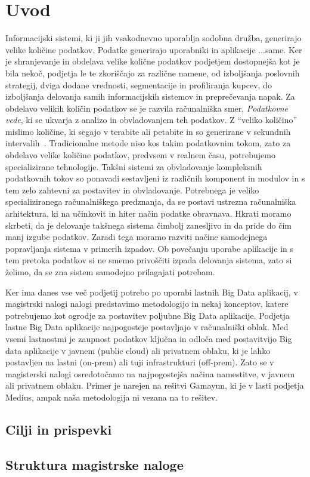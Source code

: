 \section{Uvod}

Informacijski sistemi, ki ji jih vsakodnevno uporablja sodobna družba, 
generirajo velike količine podatkov. 
Podatke generirajo uporabniki in aplikacije ...same. Ker je shranjevanje in 
obdelava velike količne podatkov podjetjem dostopnejša kot je bila nekoč, 
podjetja le te zkoriščajo za različne namene, od izboljšanja poslovnih strategij, 
dviga dodane vrednosti, segmentacije in profiliranja kupcev, 
do izboljšanja delovanja samih informacijskih sistemov in preprečevanja napak.
Za obdelavo velikih količin podatkov se je razvila računalniška smer, 
\textit{Podatkovne vede}, ki se ukvarja z analizo
in obvladovanjem teh podatkov.
Z \enquote{veliko količino} mislimo količine, ki segajo v terabite ali petabite 
in so generirane v sekundnih intervalih~\cite{toward_scalable_systems_big_data_analytics}.
Tradicionalne metode niso kos takim podatkovnim tokom, zato za obdelavo velike količine podatkov, 
predvsem v realnem času, 
potrebujemo specializirane tehnologije.
Takšni sistemi za obvladovanje kompleksnih podatkovnih tokov so ponavadi sestavljeni iz 
različnih komponent in modulov in 
s tem zelo zahtevni za postavitev in obvladovanje. 
Potrebnega je veliko specializiranega računalniškega predznanja, 
da se postavi ustrezna računalniška arhitektura, 
ki na učinkovit in hiter način podatke obravnava. 
Hkrati moramo skrbeti, da je delovanje takšnega sistema čimbolj zanesljivo in 
da pride do čim manj izgube podatkov.
Zaradi tega moramo razviti načine samodejnega popravljanja sistema v primerih izpadov.
Ob povečanju uporabe aplikacije in s 
tem pretoka podatkov si ne smemo privoščiti izpada delovanja sistema, 
zato si želimo, da se zna sistem samodejno prilagajati potrebam.

Ker ima danes vse več podjetij potrebo po uporabi lastnih Big Data aplikacij, 
v magistrski nalogi nalogi predstavimo metodologijo in nekaj konceptov,
katere potrebujemo kot ogrodje za postavitev poljubne Big Data aplikacije.
Podjetja lastne Big Data aplikacije najpogosteje postavljajo v računalniški oblak. 
Med vsemi lastnostmi je zaupnost podatkov ključna in 
odloča med postavitvijo Big data aplikacije v javnem (public cloud) ali privatnem oblaku, 
ki je lahko postavljen na lastni (on-prem) ali tuji infrastrukturi (off-prem).
Zato se v magisterski nalogi osredotočamo na najpogostejša načina namestitve,
v javnem ali privatnem oblaku. 
Primer je narejen na rešitvi Gamayun, ki je v lasti podjetja Medius, 
ampak naša metodologija ni vezana na to rešitev.

\subsection{Cilji in prispevki}
\subsection{Struktura magistrske naloge}